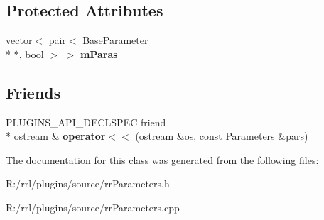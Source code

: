 \subsection*{Protected Attributes}
\begin{DoxyCompactItemize}
\item 
\hypertarget{classrrp_1_1_parameters_a46aa6ee896742516fbf10b77d21c7f0e}{vector$<$ pair$<$ \hyperlink{classrrp_1_1_base_parameter}{Base\-Parameter} \\*
$\ast$, bool $>$ $>$ {\bfseries m\-Paras}}\label{classrrp_1_1_parameters_a46aa6ee896742516fbf10b77d21c7f0e}

\end{DoxyCompactItemize}
\subsection*{Friends}
\begin{DoxyCompactItemize}
\item 
\hypertarget{classrrp_1_1_parameters_ae185fd1d58f2f7c41f89a2d3ca55f2df}{P\-L\-U\-G\-I\-N\-S\-\_\-\-A\-P\-I\-\_\-\-D\-E\-C\-L\-S\-P\-E\-C friend \\*
ostream \& {\bfseries operator$<$$<$} (ostream \&os, const \hyperlink{classrrp_1_1_parameters}{Parameters} \&pars)}\label{classrrp_1_1_parameters_ae185fd1d58f2f7c41f89a2d3ca55f2df}

\end{DoxyCompactItemize}


The documentation for this class was generated from the following files\-:\begin{DoxyCompactItemize}
\item 
R\-:/rrl/plugins/source/rr\-Parameters.\-h\item 
R\-:/rrl/plugins/source/rr\-Parameters.\-cpp\end{DoxyCompactItemize}
